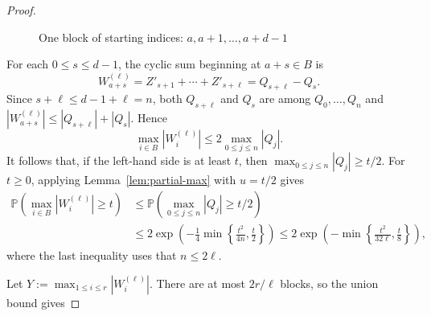 \documentclass[10pt,a4paper]{article}
\numberwithin{equation}{section}
\theoremstyle{definition}
\theoremstyle{remark}
\begin{document}
\begin{proof}
\begin{figure}[htbp]
\caption{One block of starting indices: $a,a+1,\ldots,a+d-1$}
\label{fig:cyclic-block}
\end{figure}




For each $0\le s\le d-1$, the cyclic sum beginning at $a+s\in B$ is
\[
W_{a+s}^{(\ell)}=Z'_{s+1}+\cdots+Z'_{s+\ell}=Q_{s+\ell}-Q_s.
\]
Since $s+\ell\le d-1+\ell=n$, both  $Q_{s+\ell}$ and $Q_s$ are among
$Q_0,\ldots,Q_n$ and 
$|W_{a+s}^{(\ell)}|\le |Q_{s+\ell}|+|Q_s|$. Hence
$$ \max_{i\in B}|W_i^{(\ell)}|
 \le2\max_{0\le j\le n}|Q_j|.$$
It follows that, if the left-hand side is at least $t$, then
$\max_{0\le j\le n}|Q_j|\ge t/2$.  
For $t\ge0$, applying Lemma~\ref{lem:partial-max} with $u=t/2$ gives
\begin{align*}
   \mathbb{P}\left(\max_{i\in B}|W_i^{(\ell)}|\ge t\right)&\le 
   \mathbb{P}\left(\max_{0\le j\le n}|Q_j|
   \ge t/2\right)\\
    &
 \le2\exp\left(-\frac14\min\left\{\frac{t^2}{4n},\frac t2\right\}\right)
 \le2\exp\left(-\min\left\{\frac{t^2}{32\ell},\frac{t}8\right\}\right),
\end{align*}
 where the last inequality uses that $n\le 2\ell$.

Let $Y:=\max_{1\le i\le r}|W_i^{(\ell)}|$.  There are at most $2r/\ell$ blocks, so the union bound gives


\end{proof}
\end{document}
